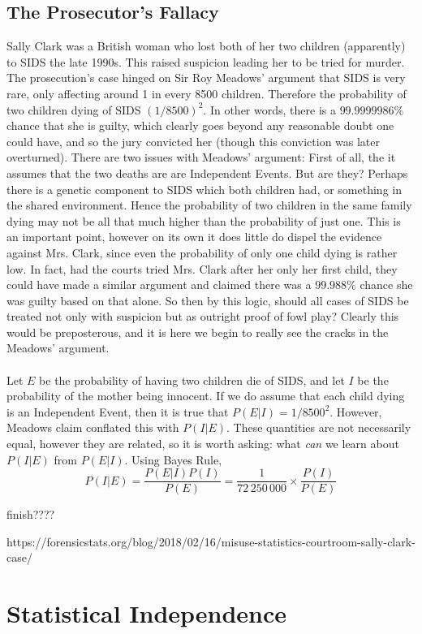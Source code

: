 \documentclass{report}
\begin{document}
\subsection{The Prosecutor's Fallacy}
Sally Clark was a British woman who lost both of her two children (apparently) to SIDS the late 1990s. This raised suspicion leading her to be tried for murder. The prosecution's case hinged on Sir Roy Meadows' argument that SIDS is very rare, only affecting around 1 in every 8500 children. Therefore the probability of two children dying of SIDS $(1/8500)^2$. In other words, there is a $99.9999986\%$ chance that she is guilty, which clearly goes beyond any reasonable doubt one could have, and so the jury convicted her (though this conviction was later overturned). There are two issues with Meadows' argument:
First of all, the it assumes that the two deaths are are Independent Events. But are they? Perhaps there is a genetic component to SIDS which both children had, or something in the shared environment. Hence the probability of two children in the same family dying may not be all that much higher than the probability of just one. This is an important point, however on its own it does little do dispel the evidence against Mrs. Clark, since even the probability of only one child dying is rather low. In fact, had the courts tried Mrs. Clark after her only her first child, they could have made a similar argument and claimed there was a $99.988\%$ chance she was guilty based on that alone. So then by this logic, should all cases of SIDS be treated not only with suspicion but as outright proof of fowl play? Clearly this would be preposterous, and it is here we begin to really see the cracks in the Meadows' argument.
\\\\
Let $E$ be the probability of having two children die of SIDS, and let $I$ be the probability of the mother being innocent. If we do assume that each child dying is an Independent Event, then it is true that $P(E|I)=1/8500^2$. However, Meadows claim conflated this with $P(I|E)$. These quantities are not necessarily equal, however they are related, so it is worth asking: what \emph{can} we learn about $P(I|E)$ from $P(E|I)$. Using Bayes Rule, 
\[
    P(I|E)=\frac{P(E|I)P(I)}{P(E)}=\frac 1 {72\,250\,000}\times \frac{P(I)}{P(E)}
\]

\todo finish????

\todo https://forensicstats.org/blog/2018/02/16/misuse-statistics-courtroom-sally-clark-case/

\section{Statistical Independence}
\end{document}
